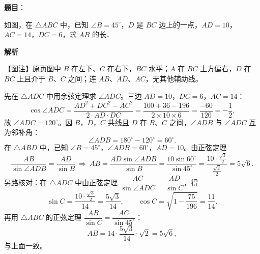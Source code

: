 \begin{answer}

\textbf{题目}：

如图，在 $\triangle ABC$ 中，已知 $\angle B=45^\circ$，$D$ 是 $BC$ 边上的一点，$AD=10$，$AC=14$，$DC=6$，求 $AB$ 的长．
\nopagebreak[4]
\begin{center}\end{center}
\nopagebreak[4]
\textbf{解析}

【图注】原页图中 $B$ 在左下、$C$ 在右下，$BC$ 水平；$A$ 在 $BC$ 上方偏右，$D$ 在 $BC$ 上且介于 $B$、$C$ 之间；连 $AB$、$AD$、$AC$，无其他辅助线。

先在 $\triangle ADC$ 中用余弦定理求 $\angle ADC$。三边 $AD=10$，$DC=6$，$AC=14$：
\nopagebreak[4]
\[\cos\angle ADC=\frac{AD^2+DC^2-AC^2}{2\cdot AD\cdot DC}=\frac{100+36-196}{2\times 10\times 6}=\frac{-60}{120}=-\frac12,\]
故 $\angle ADC=120^\circ$。因 $B$，$D$，$C$ 共线且 $D$ 在 $B$、$C$ 之间，$\angle ADB$ 与 $\angle ADC$ 互为邻补角：
\nopagebreak[4]
\[\angle ADB=180^\circ-120^\circ=60^\circ.\]
在 $\triangle ABD$ 中，已知 $\angle B=45^\circ$，$\angle ADB=60^\circ$，$AD=10$。由正弦定理
\nopagebreak[4]
\[\frac{AB}{\sin\angle ADB}=\frac{AD}{\sin B}\ \Longrightarrow\ AB=\frac{AD\sin\angle ADB}{\sin B}=\frac{10\sin 60^\circ}{\sin 45^\circ}=\frac{10\cdot\frac{\sqrt3}{2}}{\frac{\sqrt2}{2}}=5\sqrt6.\]
另路核对：在 $\triangle ADC$ 中由正弦定理 $\dfrac{AC}{\sin\angle ADC}=\dfrac{AD}{\sin C}$，得
\nopagebreak[4]
\[\sin C=\frac{10\cdot\frac{\sqrt3}{2}}{14}=\frac{5\sqrt3}{14},\qquad \cos C=\sqrt{1-\frac{75}{196}}=\frac{11}{14}.\]
再用 $\triangle ABC$ 的正弦定理 $\dfrac{AB}{\sin C}=\dfrac{AC}{\sin 45^\circ}$：
\nopagebreak[4]
\[AB=14\cdot\frac{5\sqrt3}{14}\cdot\sqrt2=5\sqrt6,\]
与上面一致。


\end{answer}
